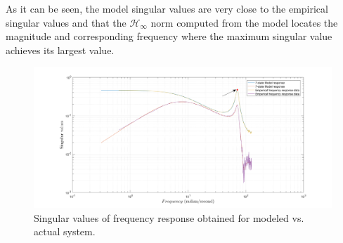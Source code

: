 \documentclass[paper=US leter, fontsize=11pt]{scrartcl}
\begin{document}
As it can be seen, the model singular values are very close to the empirical singular values
and that the $\mathcal{H}_{\infty}$ norm computed from the model locates the magnitude and corresponding frequency
where the maximum singular value achieves its largest value.

\begin{figure}[t!]  
	\centering    
	\includegraphics[scale=0.38,trim={4.5cm 0 0 0},clip]{task54.png}  
	\caption{Singular values of frequency response obtained for modeled vs. actual system.}
	\label{task34} 
\end{figure} 
\end{document}
